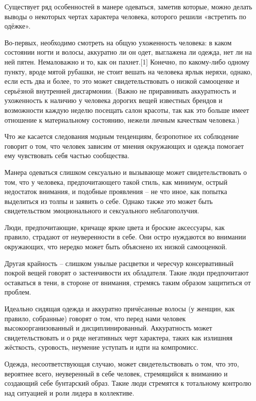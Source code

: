 Существует ряд особенностей в манере одеваться, заметив которые, можно делать выводы о некоторых чертах характера человека, которого решили «встретить по одёжке».

Во-первых, необходимо смотреть на общую ухоженность человека: в каком состоянии ногти и волосы, аккуратно ли он одет, выглажена ли одежда, нет ли на ней пятен. Немаловажно и то, как он пахнет.[1] Конечно, по какому-либо одному пункту, вроде мятой рубашки, не стоит вешать на человека ярлык неряхи, однако, если есть два и более, то это может свидетельствовать о низкой самооценке и серьёзной внутренней дисгармонии. (Важно не приравнивать аккуратность и ухоженность к наличию у человека дорогих вещей известных брендов и возможности каждую неделю посещать салон красоты, так как это больше имеет отношение к материальному состоянию, нежели личным качествам человека.)

Что же касается следования модным тенденциям, безропотное их соблюдение говорит о том, что человек зависим от мнения окружающих и одежда помогает ему чувствовать себя частью сообщества.

Манера одеваться слишком сексуально и вызывающе может свидетельствовать о том, что у человека, предпочитающего такой стиль, как минимум, острый недостаток внимания, и подобные проявления – не что иное, как попытка выделиться из толпы и заявить о себе. Однако также это может быть свидетельством эмоционального и сексуального неблагополучия.

Люди, предпочитающие, кричаще яркие цвета и броские аксессуары, как правило, страдают от неуверенности в себе. Они остро нуждаются во внимании окружающих, что нередко может быть объяснено их низкой самооценкой.

Другая крайность – слишком унылые расцветки и чересчур консервативный покрой вещей говорят о застенчивости их обладателя. Такие люди предпочитают оставаться в тени, в стороне от внимания, стремясь таким образом защититься от проблем.

Идеально сидящая одежда и аккуратно причёсанные волосы (у женщин, как правило, собранные) говорят о том, что перед нами человек высокоорганизованный и дисциплинированный. Аккуратность может свидетельствовать и о ряде негативных черт характера, таких как излишняя жёсткость, суровость, неумение уступать и идти на компромисс.

Одежда, несоответствующая случаю, может свидетельствовать о том, что это, вероятнее всего, неуверенный в себе человек, стремящийся к вниманию и создающий себе бунтарский образ. Такие люди стремятся к тотальному контролю над ситуацией и роли лидера в коллективе.

